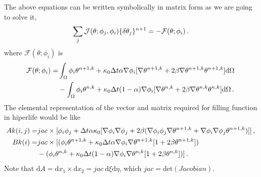 \documentclass[]{article}
\begin{document}
The above equations can be written symbolically in matrix form as we are going to solve it, 
\begin{equation}\label{eq12}
	\begin{aligned}
		\sum_j \mathcal{J}(\theta;\phi_j,\phi_i)\{\delta \theta_j\}^{n+1} = -\mathcal{F}(\theta;\phi_i)\thinspace.
	\end{aligned}
\end{equation}
where $\mathcal{F}(\theta;\phi_i)$ is
\begin{equation}\label{eq12}
	\begin{aligned}
		\mathcal{F}(\theta;\phi_i)=& \int_{\Omega} \phi_i \theta^{n+1,k} + \kappa_0 \Delta t \alpha \nabla \phi_i [\nabla \theta^{n+1,k}+2\beta \nabla \theta^{n+1,k}\theta^{n+1,k}]\mathrm{d} \Omega \\
		&-\int_{\Omega} \phi_i \theta^{n,k} + \kappa_0 \Delta t (1-\alpha) \nabla \phi_i [\nabla \theta^{n,k}+2\beta \nabla \theta^{n,k}\theta^{n,k}]\mathrm{d} \Omega\thinspace.
	\end{aligned}
\end{equation}
The elemental representation of the vector and matrix required for filling function in hiperlife would be like
\begin{equation}\label{eq13}
	\begin{aligned}[b]
		Ak (i,j) =& jac \times [\phi_i \phi_j + \Delta t \alpha \kappa_0[\nabla \phi_i\nabla \phi_j + 2 \beta(\nabla \phi_i\phi_j  \nabla \theta^{n+1,k} + \nabla \phi_i\nabla \phi_j\theta^{n+1,k} ) ]]\thinspace, \\
		Bk (i) =& jac \times [(\phi_i \theta^{n+1,k} + \kappa_0 \Delta t \alpha \nabla \phi_i \nabla \theta^{n+1,k} [1+2\beta\theta^{n+1,k}]) \\
		&- (\phi_i \theta^{n,k} + \kappa_0 \Delta t (1-\alpha) \nabla \phi_i\nabla \theta^{n,k} [1+2\beta \theta^{n,k}])]\thinspace.
	\end{aligned}
\end{equation}
Note that $\mathrm{d}A=\mathrm{d}x_{1} \times \mathrm{d}x_{2}=jac \ \mathrm{d}\xi \mathrm{d}\eta$, which $jac=\mathrm{det}(Jacobian)$.
\end{document}
